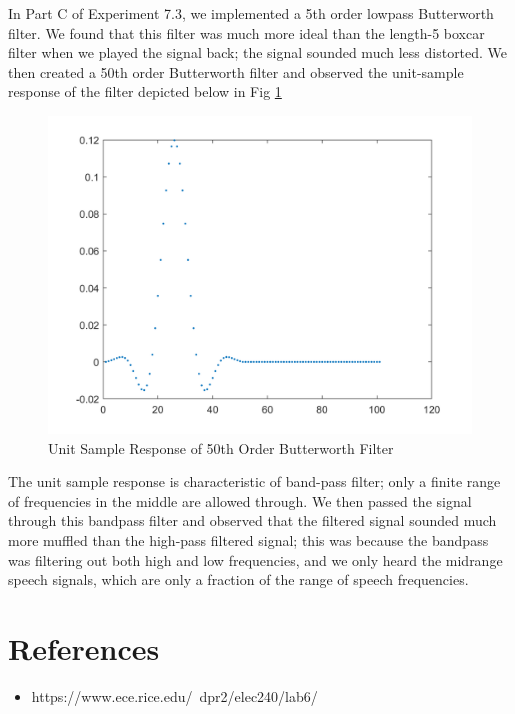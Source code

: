 \documentclass[10pt]{article}
\begin{document}
In Part C of Experiment 7.3, we implemented a 5th order lowpass Butterworth filter. We found that this filter was much more ideal than the length-5 boxcar filter when we played the signal back; the signal sounded much less distorted. We then created a 50th order Butterworth filter and observed the unit-sample response of the filter depicted below in Fig \ref{fig:50order}

\begin{centering}
	\begin{figure} [H]
		\centering
		\includegraphics[scale=0.22]{images/unitsample50orderFIR.png}
		\caption{Unit Sample Response of 50th Order Butterworth Filter}
		\label{fig:50order}
	\end{figure}
\end{centering}

The unit sample response is characteristic of band-pass filter; only a finite range of frequencies in the middle are allowed through. We then passed the signal through this bandpass filter and observed that the filtered signal sounded much more muffled than the high-pass filtered signal; this was because the bandpass was filtering out both high and low frequencies, and we only heard the midrange speech signals, which are only a fraction of the range of speech frequencies. 

\medskip


\section{References}
\begin{itemize}
	\item https://www.ece.rice.edu/~dpr2/elec240/lab6/
\end{itemize}
\medskip
\end{document}
